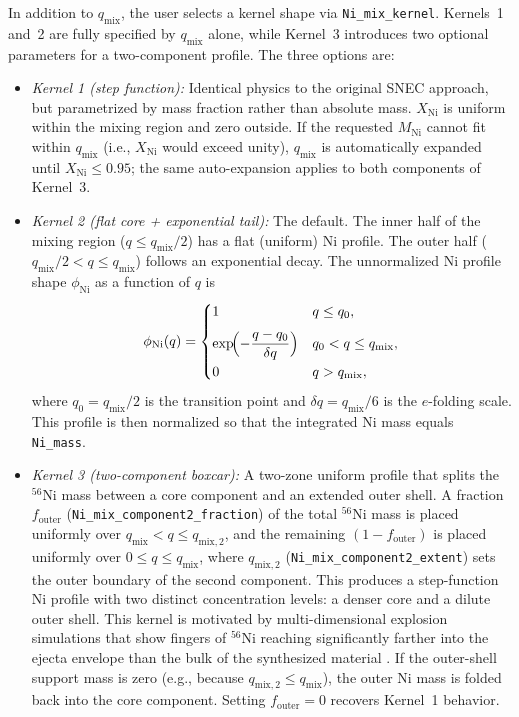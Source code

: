 \documentclass[twocolumn,linenumbers]{aastex701}
\begin{document}
In addition to $q_{\mathrm{mix}}$, the user selects a kernel shape via \texttt{Ni\_mix\_\-kernel}. Kernels~1 and~2 are fully specified by $q_{\mathrm{mix}}$ alone, while Kernel~3 introduces two optional parameters for a two-component profile. The three options are:
\begin{itemize}
\item \textit{Kernel 1 (step function):} Identical physics to the original SNEC approach, but parametrized by mass fraction rather than absolute mass. $X_{\mathrm{Ni}}$ is uniform within the mixing region and zero outside. If the requested $M_{\mathrm{Ni}}$ cannot fit within $q_{\mathrm{mix}}$ (i.e., $X_{\mathrm{Ni}}$ would exceed unity), $q_{\mathrm{mix}}$ is automatically expanded until $X_{\mathrm{Ni}} \leq 0.95$; the same auto-expansion applies to both components of Kernel~3.
\item \textit{Kernel 2 (flat core + exponential tail):} The default. The inner half of the mixing region ($q \leq q_{\mathrm{mix}}/2$) has a flat (uniform) Ni profile. The outer half ($q_{\mathrm{mix}}/2 < q \leq q_{\mathrm{mix}}$) follows an exponential decay. The unnormalized Ni profile shape $\phi_{\mathrm{Ni}}$ as a function of $q$ is
\begin{equation}
\phi_{\mathrm{Ni}}(q) = \begin{cases}
1 & q \leq q_0, \\[6pt]
\exp\!\Bigl(-\dfrac{q - q_0}{\delta q}\Bigr) & q_0 < q \leq q_{\mathrm{mix}}, \\[6pt]
0 & q > q_{\mathrm{mix}},
\end{cases}
\end{equation}
where $q_0 = q_{\mathrm{mix}}/2$ is the transition point and $\delta q = q_{\mathrm{mix}}/6$ is the $e$-folding scale. This profile is then normalized so that the integrated Ni mass equals \texttt{Ni\_mass}.
\item \textit{Kernel 3 (two-component boxcar):} A two-zone uniform profile that splits the $^{56}$Ni mass between a core component and an extended outer shell. A fraction $f_{\mathrm{outer}}$ (\texttt{Ni\_mix\_\-component2\_fraction}) of the total $^{56}$Ni mass is placed uniformly over $q_{\mathrm{mix}} < q \leq q_{\mathrm{mix,2}}$, and the remaining $(1 - f_{\mathrm{outer}})$ is placed uniformly over $0 \leq q \leq q_{\mathrm{mix}}$, where $q_{\mathrm{mix,2}}$ (\texttt{Ni\_mix\_\-component2\_extent}) sets the outer boundary of the second component. This produces a step-function Ni profile with two distinct concentration levels: a denser core and a dilute outer shell. This kernel is motivated by multi-dimensional explosion simulations that show fingers  of $^{56}$Ni reaching significantly farther into the ejecta envelope than the bulk of the synthesized material \citep{Kifonidis2003}. If the outer-shell support mass is zero (e.g., because $q_{\mathrm{mix,2}} \leq q_{\mathrm{mix}}$), the outer Ni mass is folded back into the core component. Setting $f_{\mathrm{outer}} = 0$ recovers Kernel~1 behavior.
\end{itemize}
\end{document}
